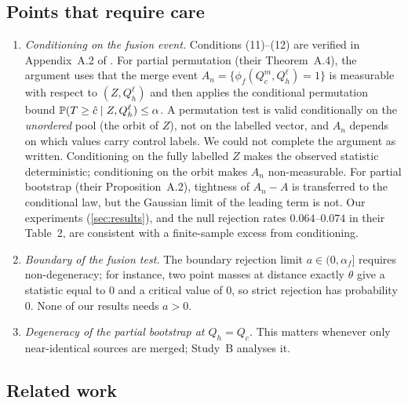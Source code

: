 \documentclass[11pt,a4paper]{article}
\begin{document}
\subsection{Points that require care}\label{sec:care}

\begin{enumerate}[leftmargin=1.4em,itemsep=2pt]
\item \emph{Conditioning on the fusion event.} Conditions (11)--(12) are verified in Appendix~A.2 of \citet{yang2026}. For partial permutation (their Theorem~A.4), the argument uses that the merge event $A_n=\{\phi_f(Q_c^m,Q_h^\ell)=1\}$ is measurable with respect to $(Z,Q_h^\ell)$ and then applies the conditional permutation bound $\P(T\ge\hat c\mid Z,Q_h^\ell)\le\alpha$. A permutation test is valid conditionally on the \emph{unordered} pool (the orbit of $Z$), not on the labelled vector, and $A_n$ depends on which values carry control labels. We could not complete the argument as written. Conditioning on the fully labelled $Z$ makes the observed statistic deterministic; conditioning on the orbit makes $A_n$ non-measurable. For partial bootstrap (their Proposition~A.2), tightness of $A_n-A$ is transferred to the conditional law, but the Gaussian limit of the leading term is not. Our experiments (\cref{sec:results}), and the null rejection rates $0.064$--$0.074$ in their Table~2, are consistent with a finite-sample excess from conditioning.
\item \emph{Boundary of the fusion test.} The boundary rejection limit $a\in(0,\alpha_f]$ requires non-degeneracy; for instance, two point masses at distance exactly $\theta$ give a statistic equal to $0$ and a critical value of $0$, so strict rejection has probability $0$. None of our results needs $a>0$.
\item \emph{Degeneracy of the partial bootstrap at $Q_h=Q_c$.} This matters whenever only near-identical sources are merged; Study~B analyses it.
\end{enumerate}

\subsection{Related work}\label{sec:related}
\end{document}
